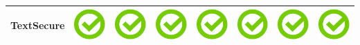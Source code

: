 \documentclass[10pt,foldmark,tumble]{leaflet}
\begin{document}
{\begin{tabular}{ L{2cm} | C{2cm} | C{2cm} | C{2cm} | C{2cm} | C{2cm} | C{2cm} | C{2cm} | }
TextSecure & \includegraphics[scale=0.1]{pics/haken.png} & \includegraphics[scale=0.1]{pics/haken.png} & \includegraphics[scale=0.1]{pics/haken.png} & \includegraphics[scale=0.1]{pics/haken.png} & \includegraphics[scale=0.1]{pics/haken.png} & \includegraphics[scale=0.1]{pics/haken.png} & \includegraphics[scale=0.1]{pics/haken.png} \tabularnewline
\hline
\end{tabular}
}
 
\end{document}
